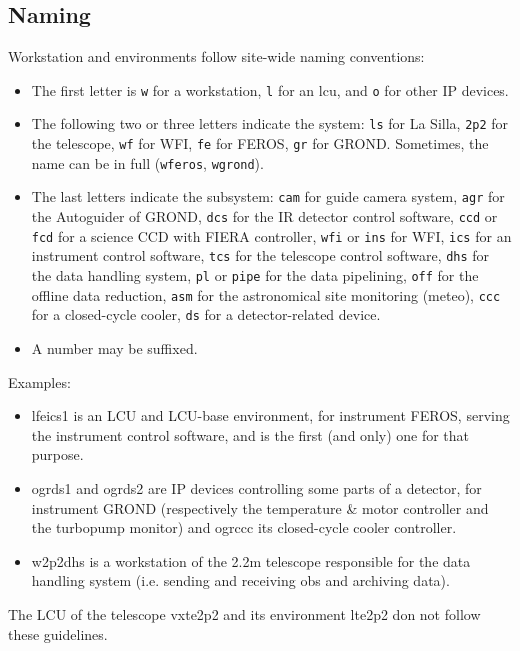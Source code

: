 \documentclass[11pt,fleqn,a4paper]{book}
\begin{document}
\subsection{Naming}
Workstation and environments follow site-wide naming conventions:
\begin{itemize}
    \item The first letter is \texttt{w} for a \gls{workstation}, \texttt{l} for an \gls{lcu}, and \texttt{o} for other IP devices.
    \item The following two or three letters indicate the system: \texttt{ls} for La Silla, \texttt{2p2} for the telescope, \texttt{wf} for WFI, \texttt{fe} for FEROS, \texttt{gr} for GROND. Sometimes, the name can be in full (\texttt{wferos}, \texttt{wgrond}).
    \item The last letters indicate the subsystem: \texttt{cam} for guide camera system, \texttt{agr} for the Autoguider of GROND, \texttt{dcs} for the IR detector control software, \texttt{ccd} or \texttt{fcd} for a science CCD with FIERA controller, \texttt{wfi} or \texttt{ins} for WFI, \texttt{ics} for an instrument control software, \texttt{tcs} for the telescope control software, \texttt{dhs} for the data handling system, \texttt{pl} or \texttt{pipe} for the data pipelining, \texttt{off} for the offline data reduction, \texttt{asm} for the  astronomical site monitoring (meteo), \texttt{ccc} for a closed-cycle cooler, \texttt{ds} for a detector-related device.
    \item A number may be suffixed.
\end{itemize}

Examples:
\begin{itemize}
\item \gls{lfeics1} is an LCU and LCU-base environment, for instrument FEROS, serving the instrument control software, and is the first (and only) one for that purpose. 
\item \gls{ogrds1} and \gls{ogrds2} are IP devices controlling some parts of a detector, for instrument GROND (respectively the temperature \& motor controller and the turbopump monitor) and \gls{ogrccc} its closed-cycle cooler controller.
\item \gls{w2p2dhs} is a workstation of the 2.2m telescope responsible for the data handling system (i.e. sending and receiving \glspl{ob} and archiving data). 
\end{itemize}

The LCU of the telescope \gls{vxte2p2} and its environment \gls{lte2p2} don not follow these guidelines.
\end{document}
